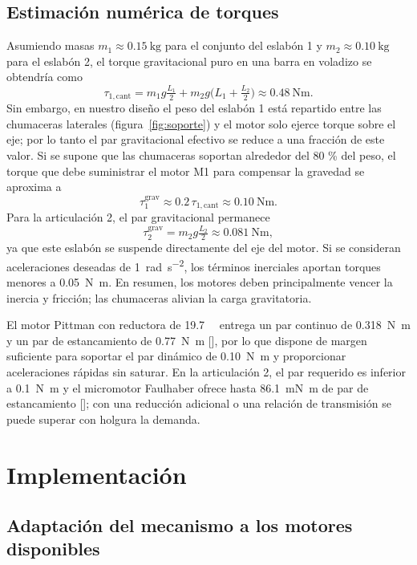 \documentclass[11pt,a4paper]{article}
\begin{document}
\subsection{Estimación numérica de torques}

Asumiendo masas $m_1\approx\SI{0.15}{\kilogram}$ para el conjunto del eslabón 1 y $m_2\approx\SI{0.10}{\kilogram}$ para el eslabón 2, el torque gravitacional puro en una barra en voladizo se obtendría como
\[ \tau_{1,\text{cant}} = m_1 g \tfrac{L_1}{2} + m_2 g \bigl(L_1 + \tfrac{L_2}{2}\bigr) \approx \SI{0.48}{\newton\metre}. \]
Sin embargo, en nuestro diseño el peso del eslabón 1 está repartido entre las chumaceras laterales (figura~\ref{fig:soporte}) y el motor solo ejerce torque sobre el eje; por lo tanto el par gravitacional efectivo se reduce a una fracción de este valor.  Si se supone que las chumaceras soportan alrededor del 80 \% del peso, el torque que debe suministrar el motor M1 para compensar la gravedad se aproxima a
\[ \tau_1^{\text{grav}} \approx 0.2\, \tau_{1,\text{cant}} \approx \SI{0.10}{\newton\metre}. \]
Para la articulación 2, el par gravitacional permanece
\[ \tau_2^{\text{grav}} = m_2 g \tfrac{L_2}{2} \approx \SI{0.081}{\newton\metre}, \]
ya que este eslabón se suspende directamente del eje del motor.  Si se consideran aceleraciones deseadas de \SI{1}{\radian\per\second\squared}, los términos inerciales aportan torques menores a \SI{0.05}{\newton\metre}.  En resumen, los motores deben principalmente vencer la inercia y fricción; las chumaceras alivian la carga gravitatoria.

El motor Pittman con reductora de \SI{19.7}{\colon{}} entrega un par continuo de \SI{0.318}{\newton\metre} y un par de estancamiento de \SI{0.77}{\newton\metre} [\!\cite{pittman}], por lo que dispone de margen suficiente para soportar el par dinámico de \SI{0.10}{\newton\metre} y proporcionar aceleraciones rápidas sin saturar.  En la articulación 2, el par requerido es inferior a \SI{0.1}{\newton\metre} y el micromotor Faulhaber ofrece hasta \SI{86.1}{\milli\newton\metre} de par de estancamiento [\!\cite{faulhaber}]; con una reducción adicional o una relación de transmisión se puede superar con holgura la demanda.


\section{Implementación}


\subsection{Adaptación del mecanismo a los motores disponibles}
\end{document}
